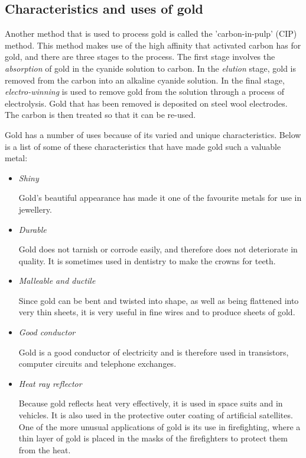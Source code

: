 \subsection{Characteristics and uses of gold}

\begin{IFact}{
Another method that is used to process gold is called the 'carbon-in-pulp' (CIP) method. This method makes use of the high affinity that activated carbon has for gold, and there are three stages to the process. The first stage involves the \emph{absorption} of gold in the cyanide solution to carbon. In the \emph{elution} stage, gold is removed from the carbon into an alkaline cyanide solution. In the final stage, \emph{electro-winning} is used to remove gold from the solution through a process of electrolysis. Gold that has been removed is deposited on steel wool electrodes. The carbon is then treated so that it can be re-used.}
\end{IFact}
Gold has a number of uses because of its varied and unique characteristics. Below is a list of some of these characteristics that have made gold such a valuable metal:
\begin{itemize}

\item \emph{Shiny}

Gold's beautiful appearance has made it one of the favourite metals for use in jewellery.

\item \emph{Durable}

Gold does not tarnish or corrode easily, and therefore does not deteriorate in quality. It is sometimes used in dentistry to make the crowns for teeth.

\item \emph{Malleable and ductile}

Since gold can be bent and twisted into shape, as well as being flattened into very thin sheets, it is very useful in fine wires and to produce sheets of gold.

\item \emph{Good conductor}

Gold is a good conductor of electricity and is therefore used in transistors, computer circuits and telephone exchanges.

\item \emph{Heat ray reflector}

Because gold reflects heat very effectively, it is used in space suits and in vehicles. It is also used in the protective outer coating of artificial satellites. One of the more unusual applications of gold is its use in firefighting, where a thin layer of gold is placed in the masks of the firefighters to protect them from the heat.

\end{itemize}

